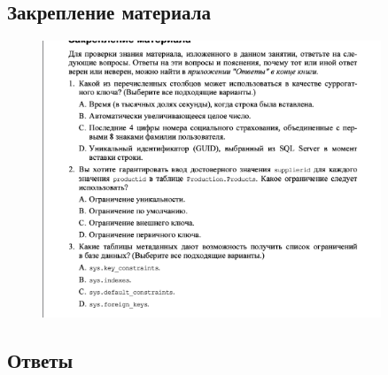 \subsection*{Закрепление материала}

\begin{figure}[h!]
	\begin{center}
		\includegraphics[width=0.9\textwidth]{img/zakrep16.png}
	\end{center}
	\captionsetup{justification=centering}
\end{figure}
\clearpage

\subsection*{Ответы}

